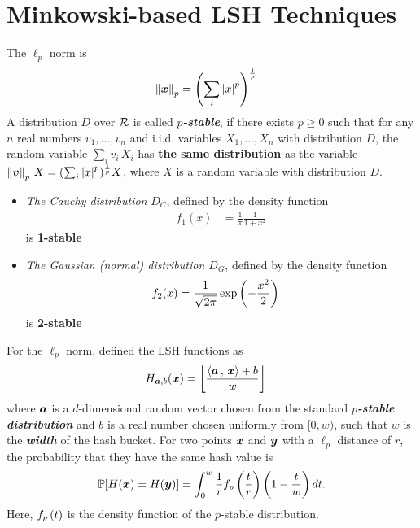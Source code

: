 \documentclass[11pt]{article}
\begin{document}
\section{Minkowski-based LSH Techniques}
The $\ell_{p}$ norm is 
\begin{align*}
\left\|\boldsymbol{x}\right\|_{p} &= \left(\sum_{i}\left\lvert x \right\rvert^{p}\right)^{\frac{1}{p}}
\end{align*}  A distribution $D$ over ${\mathcal R}$ is called \emph{\textbf{$p$-stable}}, if there exists $p \ge 0$ such that for any $n$ real numbers $v_1, \ldots, v_n$ and i.i.d. variables $X_1,\ldots, X_n$ with distribution $D$, the random variable $\sum_{i}v_i\,X_i$ has \textbf{the same distribution} as the variable  $\left\|\boldsymbol{v}\right\|_{p}\,X =(\sum_{i}\left\lvert x \right\rvert^{p})^{\frac{1}{p}}X$, where $X$ is a random variable with distribution $D$. 
\begin{itemize}
\item \emph{The Cauchy distribution} $D_C$, defined by the density function
\begin{align*}
f_{1}(x) &=\frac{1}{\pi} \frac{1}{1 + x^2}
\end{align*} is \textbf{1-stable}
\item \emph{The Gaussian (normal) distribution $D_G$}, defined by the density function
\begin{align*}
f_{2}(x) &= \frac{1}{\sqrt{2\pi}}\exp\left(-\frac{x^2}{2}\right)
\end{align*} is \textbf{2-stable}
\end{itemize}


For the $\ell_{p}$ norm,  \citep{datar2004locality} defined the LSH functions as 
\begin{align}
H_{\boldsymbol{a}, b}(\boldsymbol{x}) &= \left\lfloor \frac{\left\langle \boldsymbol{a}\,,\, \boldsymbol{x} \right\rangle + b}{w} \right\rfloor \label{eqn: lsh_lp}
\end{align}
where $\boldsymbol{a}$ is a $d$-dimensional random vector chosen from the standard \emph{\textbf{$p$-stable distribution}} and $b$ is a real number chosen uniformly from $[0, w)$, such that $w$ is the \textbf{\emph{width}} of the hash bucket. For two points $\boldsymbol{x}$ and $\boldsymbol{y}$ with a $\ell_{p}$ distance of $r$, the probability that they have the same hash value is $${\mathbb P}[H(\boldsymbol{x}) = H(\boldsymbol{y})] = \int_{0}^{w}\frac{1}{r}f_{p}\left(\frac{t}{r}\right)\left(1- \frac{t}{w}\right)dt.$$ Here, $f_{p}\left(t\right)$ is the density function of the $p$-stable distribution.

\newpage


\end{document}
